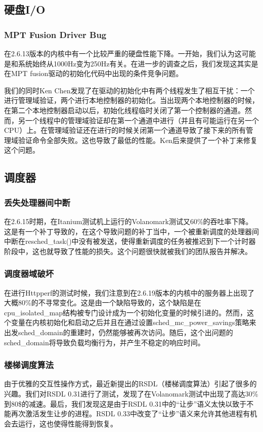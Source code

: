 \subsection{硬盘I/O}
\subsubsection{MPT Fusion Driver Bug}
在2.6.13版本的内核中有一个比较严重的硬盘性能下降。一开始，我们认为这可能是和系统始终从1000Hz变为250Hz有关。在进一步的调查之后，我们发现这其实是在MPT fusion驱动的初始化代码中出现的条件竞争问题。

我们的同时Ken Chen发现了在驱动的初始化中有两个线程发生了相互干扰：一个进行管理域验证，两个进行本地控制器的初始化。当出现两个本地控制器的时候，在第二个本地控制器启动以后，初始化线程临时关闭了第一个控制器的通道。然而，另一个线程中的管理域验证却在第一个通道中进行（并且有可能运行在另一个CPU）上。在管理域验证还在进行的时候关闭第一个通道导致了接下来的所有管理域验证命令全部失败。这也导致了最低的性能。Ken后来提供了一个补丁来修复这个问题。

\subsection{调度器}
\subsubsection{丢失处理器间中断}
在2.6.15时期，在Itanium测试机上运行的Volanomark测试又60\%的吞吐率下降。这是有一个补丁导致的，在这个导致问题的补丁当中，一个被重新调度的处理器间中断在resched\_task()中没有被发送，使得重新调度的任务被推迟到下一个计时器阶段中，这也就导致了性能的损失。这个问题很快就被我们的团队报告并解决。
\subsubsection{调度器域破坏}

在进行Httpperf的测试时候，我们注意到在2.6.19版本的内核中的服务器上出现了大概80\%的不寻常变化。这是由一个缺陷导致的，这个缺陷是在cpu\_isolated\_map结构被专门设计成为一个初始化变量的时候引进的。然而，这个变量在内核初始化和启动之后并且在通过设置sched\_mc\_power\_savings策略来出发sched\_domain的重建时，仍然能够被再次访问。随后，这个出问题的sched\_domain将导致负载均衡行为，并产生不稳定的响应时间。

\subsubsection{楼梯调度算法}
由于优雅的交互性操作方式，最近新提出的RSDL（楼梯调度算法）引起了很多的兴趣。我们对RSDL 0.31进行了测试，发现了在Volanomark测试中出现了高达30\%到80\$的减速。最后，我们发现这是由于RSDL 0.31中的“让步”语义太快以致于不能再次激活发生让步的进程。RSDL 0.33中改变了“让步”语义来允许其他进程有机会去运行，这也使得性能得到恢复。

